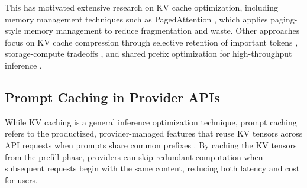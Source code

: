 \documentclass{article}
\theoremstyle{plain}
\theoremstyle{definition}
\theoremstyle{remark}
\begin{document}

This has motivated extensive research on KV cache optimization, including memory management techniques such as PagedAttention \citep{kwon2023pagedattention}, which applies paging-style memory management to reduce fragmentation and waste. Other approaches focus on KV cache compression through selective retention of important tokens \citep{ge2023adaptivekvcache}, storage-compute tradeoffs \citep{jin2024cake}, and shared prefix optimization for high-throughput inference \citep{juravsky2024hydragen, wu2024layer, shadowkv2024, survey_efficient_inference2024}.

\subsection{Prompt Caching in Provider APIs}
\label{subsec:prompt_caching}

While KV caching is a general inference optimization technique, prompt caching refers to the productized, provider-managed features that reuse KV tensors across API requests when prompts share common prefixes \citep{openai_prompt_caching_docs, Gim2024}. By caching the KV tensors from the prefill phase, providers can skip redundant computation when subsequent requests begin with the same content, reducing both latency and cost for users.
\end{document}
